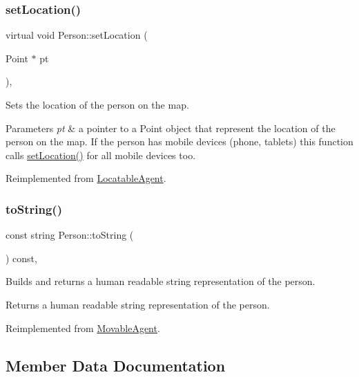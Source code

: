 \subsubsection{\texorpdfstring{setLocation()}{setLocation()}}
{\footnotesize\ttfamily virtual void Person\+::set\+Location (\begin{DoxyParamCaption}\item[{Point $\ast$}]{pt }\end{DoxyParamCaption})\hspace{0.3cm}{\ttfamily [override]}, {\ttfamily [virtual]}}

Sets the location of the person on the map. 
\begin{DoxyParams}{Parameters}
{\em pt} & a pointer to a Point object that represent the location of the person on the map. If the person has mobile devices (phone, tablets) this function calls \mbox{\hyperlink{class_person_a05f4ac2107d59e03f0f336eda08aa358}{set\+Location()}} for all mobile devices too. \\
\hline
\end{DoxyParams}


Reimplemented from \mbox{\hyperlink{class_locatable_agent_a754b237c404b77714fedd397f214bc02}{Locatable\+Agent}}.

\mbox{\label{class_person_a68872538da519d0a04297f43376db27c}} 
\subsubsection{\texorpdfstring{toString()}{toString()}}
{\footnotesize\ttfamily const string Person\+::to\+String (\begin{DoxyParamCaption}{ }\end{DoxyParamCaption}) const\hspace{0.3cm}{\ttfamily [override]}, {\ttfamily [virtual]}}

Builds and returns a human readable string representation of the person. \begin{DoxyReturn}{Returns}
a human readable string representation of the person. 
\end{DoxyReturn}


Reimplemented from \mbox{\hyperlink{class_movable_agent_a1dee2a6bf93f01006fadfb6fba6c9a59}{Movable\+Agent}}.



\subsection{Member Data Documentation}
\mbox{\label{class_person_a743e071da10a5ac9150f61df919cfbb4}} 
